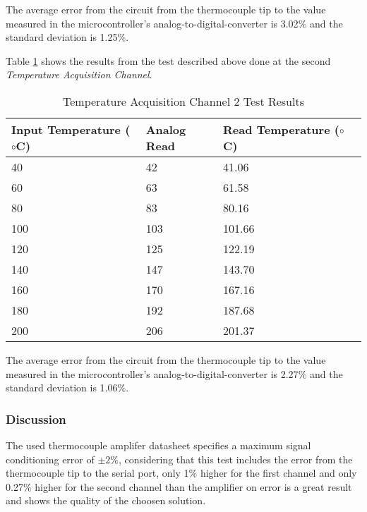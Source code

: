 			The average error from the circuit from the thermocouple tip to the value measured in the microcontroller's analog-to-digital-converter is 3.02$\%$ and the standard deviation is 1.25$\%$. 
			

			Table \ref{table:results-temp2-test} shows the results from the test described above done at the second \textit{Temperature Acquisition Channel}.

				\begin{table}[h!]
					\begin{tabular}{|l|l|l|l|}
						\hline
						\textbf{Input Temperature (${\circ}$C)} & \textbf{Analog Read} & \textbf{Read Temperature (${\circ}$C)} \\ \hline
						40 & 42 & 41.06 \\ \hline
						60 & 63 & 61.58 \\ \hline
						80 & 83 & 80.16 \\ \hline
						100 & 103 & 101.66 \\ \hline
						120 & 125 & 122.19 \\ \hline
						140 & 147 & 143.70 \\ \hline
						160 & 170 & 167.16 \\ \hline
						180 & 192 & 187.68 \\ \hline
						200 & 206 & 201.37 \\ \hline
					\end{tabular}
					\caption{Temperature Acquisition Channel 2 Test Results}
					\label{table:results-temp2-test}
				\end{table}

			The average error from the circuit from the thermocouple tip to the value measured in the microcontroller's analog-to-digital-converter is 2.27$\%$ and the standard deviation is 1.06$\%$. 

	\subsubsection{Discussion}

		The used thermocouple amplifer datasheet \cite{ad8495-datasheet} specifies a maximum signal conditioning error of $\pm2\%$, considering that this test includes the error from the thermocouple tip to the serial port, only 1$\%$ higher for the first channel and only 0.27$\%$ higher for the second channel than the amplifier on error is a great result and shows the quality of the choosen solution.
